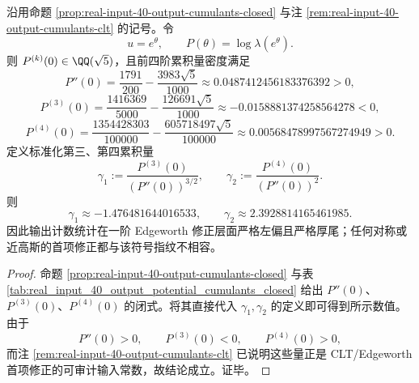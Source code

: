 \begin{theorem}\label{thm:xi-real-input-40-output-edgeworth-nongaussian}
沿用命题 \ref{prop:real-input-40-output-cumulants-closed} 与注 \ref{rem:real-input-40-output-cumulants-clt} 的记号。令
\[
u=e^\theta,
\qquad
P(\theta)=\log \lambda(e^\theta).
\]
则 \(P^{(k)}(0)\in \QQ(\sqrt5)\)，且前四阶累积量密度满足
\[
P''(0)=\frac{1791}{200}-\frac{3983\sqrt5}{1000}
\approx 0.0487412456183376392>0,
\]
\[
P^{(3)}(0)=\frac{1416369}{5000}-\frac{126691\sqrt5}{1000}
\approx -0.0158881374258564278<0,
\]
\[
P^{(4)}(0)=\frac{1354428303}{100000}-\frac{605718497\sqrt5}{100000}
\approx 0.00568478997567274949>0.
\]
定义标准化第三、第四累积量
\[
\gamma_1:=\frac{P^{(3)}(0)}{(P''(0))^{3/2}},
\qquad
\gamma_2:=\frac{P^{(4)}(0)}{(P''(0))^2}.
\]
则
\[
\boxed{\;
\gamma_1\approx -1.476481644016533,
\qquad
\gamma_2\approx 2.3928814165461985.\;}
\]
因此输出计数统计在一阶 Edgeworth 修正层面严格左偏且严格厚尾；任何对称或近高斯的首项修正都与该符号指纹不相容。
\end{theorem}
\begin{proof}
命题 \ref{prop:real-input-40-output-cumulants-closed} 与表 \ref{tab:real_input_40_output_potential_cumulants_closed} 给出 \(P''(0)\)、\(P^{(3)}(0)\)、\(P^{(4)}(0)\) 的闭式。将其直接代入 \(\gamma_1,\gamma_2\) 的定义即可得到所示数值。由于
\[
P''(0)>0,\qquad P^{(3)}(0)<0,\qquad P^{(4)}(0)>0,
\]
而注 \ref{rem:real-input-40-output-cumulants-clt} 已说明这些量正是 CLT/Edgeworth 首项修正的可审计输入常数，故结论成立。证毕。
\end{proof}





